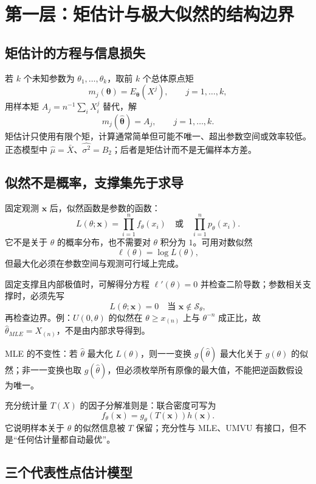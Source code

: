 \documentclass[11pt,a4paper]{ctexart}
\begin{document}
\section{第一层：矩估计与极大似然的结构边界}

\subsection{矩估计的方程与信息损失}

若 $k$ 个未知参数为 $\theta_1,\ldots,\theta_k$，取前 $k$ 个总体原点矩
\[
m_j(\boldsymbol\theta)=E_{\boldsymbol\theta}(X^j),\qquad j=1,\ldots,k,
\]
用样本矩 $A_j=n^{-1}\sum_iX_i^j$ 替代，解
\[
m_j(\widehat{\boldsymbol\theta})=A_j,\qquad j=1,\ldots,k.
\]
矩估计只使用有限个矩，计算通常简单但可能不唯一、超出参数空间或效率较低。正态模型中 $\widehat\mu=\bar X$、$\widehat{\sigma^2}=B_2$；后者是矩估计而不是无偏样本方差。

\subsection{似然不是概率，支撑集先于求导}

固定观测 $\boldsymbol x$ 后，似然函数是参数的函数：
\[
L(\theta;\boldsymbol x)=\prod_{i=1}^nf_\theta(x_i)\quad\text{或}\quad\prod_{i=1}^np_\theta(x_i).
\]
它不是关于 $\theta$ 的概率分布，也不需要对 $\theta$ 积分为 $1$。可用对数似然
\[
\ell(\theta)=\log L(\theta),
\]
但最大化必须在参数空间与观测可行域上完成。

固定支撑且内部极值时，可解得分方程 $\ell'(\theta)=0$ 并检查二阶导数；参数相关支撑时，必须先写
\[
L(\theta;\boldsymbol x)=0\quad\text{当 }\boldsymbol x\notin\mathcal S_\theta,
\]
再检查边界。例：$U(0,\theta)$ 的似然在 $\theta\ge x_{(n)}$ 上与 $\theta^{-n}$ 成正比，故 $\widehat\theta_{MLE}=X_{(n)}$，不是由内部求导得到。

MLE 的不变性：若 $\widehat\theta$ 最大化 $L(\theta)$，则一一变换 $g(\widehat\theta)$ 最大化关于 $g(\theta)$ 的似然；非一一变换也取 $g(\widehat\theta)$，但必须枚举所有原像的最大值，不能把逆函数假设为唯一。

充分统计量 $T(X)$ 的因子分解准则是：联合密度可写为
\[
f_\theta(\boldsymbol x)=g_\theta(T(\boldsymbol x))h(\boldsymbol x).
\]
它说明样本关于 $\theta$ 的似然信息被 $T$ 保留；充分性与 MLE、UMVU 有接口，但不是“任何估计量都自动最优”。

\subsection{三个代表性点估计模型}
\end{document}
